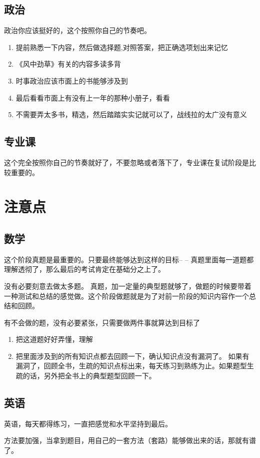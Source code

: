 \documentclass[a4paper]{ctexart}
\begin{document}
\subsection{政治}
政治你应该挺好的，这个按照你自己的节奏吧。
\begin{enumerate}
    \item 提前熟悉一下内容，然后做选择题,对照答案，把正确选项划出来记忆
    \item 《风中劲草》有关的内容多读多背
    \item 时事政治应该市面上的书能够涉及到
    \item 最后看看市面上有没有上一年的那种小册子，看看
    \item 不需要弄太多书，精选，然后踏踏实实记就可以了，战线拉的太广没有意义
\end{enumerate}

\subsection{专业课}
这个完全按照你自己的节奏就好了，不要忽略或者落下了，专业课在复试阶段是比较重要的。


\section{注意点}
\par
\subsection{数学}
\par 这个阶段真题是最重要的。只要最终能够达到这样的目标-- -- 真题里面每一道题都理解透彻了，那么最后的考试肯定在基础分之上了。
\par 没有必要刻意去做太多题。 真题，加一定量的典型题就够了，做题的时候要带着一种测试和总结的感觉做。这个阶段做题就是为了对前一阶段的知识内容作一个总结和回顾。
\par 有不会做的题，没有必要紧张，只需要做两件事就算达到目标了
\begin{enumerate}
    \item 把这道题好好弄懂，理解
    \item 把里面涉及到的所有知识点都去回顾一下，确认知识点没有漏洞了。 如果有漏洞了，回顾全书，生疏的知识点标出来，每天练习到熟练为止。如果题型生疏的话，另外把全书上的典型题型回顾一下。
\end{enumerate}

\subsection{英语}
\par 英语，每天都得练习，一直把感觉和水平坚持到最后。
\par 方法要加强，当拿到题目，用自己的一套方法（套路）能够做出来的话，那就有谱了。
\end{document}
